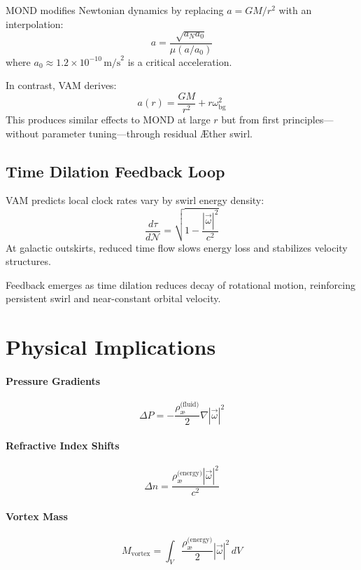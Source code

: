 \documentclass[12pt]{article}
\begin{document}
    MOND modifies Newtonian dynamics by replacing $a = GM/r^2$ with an interpolation:
    \[
        a = \frac{\sqrt{a_N a_0}}{\mu(a/a_0)}
    \]
    where $a_0 \approx 1.2 \times 10^{-10} \, \text{m/s}^2$ is a critical acceleration.

    In contrast, VAM derives:
    \[
        a(r) = \frac{G M}{r^2} + r \omega_{\text{bg}}^2
    \]
    This produces similar effects to MOND at large $r$ but from first principles—without parameter tuning—through residual \AE{}ther swirl.

    \subsection{Time Dilation Feedback Loop}

    VAM predicts local clock rates vary by swirl energy density:
    \[
        \frac{d\tau}{d\mathcal{N}} = \sqrt{1 - \frac{|\vec{\omega}|^2}{c^2}}
    \]
    At galactic outskirts, reduced time flow slows energy loss and stabilizes velocity structures.

    Feedback emerges as time dilation reduces decay of rotational motion, reinforcing persistent swirl and near-constant orbital velocity.

    \section{Physical Implications}

    \paragraph{Pressure Gradients}
    \[
        \Delta P = -\frac{\rho_{\text{\ae}}^{\text{(fluid)}}}{2} \nabla |\vec{\omega}|^2
    \]

    \paragraph{Refractive Index Shifts}
    \[
        \Delta n = \frac{\rho_{\text{\ae}}^{\text{(energy)}} |\vec{\omega}|^2}{c^2}
    \]

    \paragraph{Vortex Mass}
    \[
        M_{\text{vortex}} = \int_V \frac{\rho_{\text{\ae}}^{\text{(energy)}}}{2} |\vec{\omega}|^2 \, dV
    \]
\end{document}
